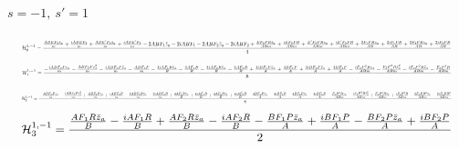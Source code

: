 \documentclass[10pt]{article}
\begin{document}
\paragraph{$s=-1,\ s'=1$}
\begin{equation*}
\resizebox{0.98\textwidth}{!}{${\displaystyle \mathcal H^{1,-1}_0=\frac{\frac{A B E F_2 \bar z_a}{m} + \frac{i A B E F_2}{m} + \frac{A B E' F_2 \bar z_a}{m} + \frac{i A B E' F_2}{m} - 2 A B F_1 \bar z_a - 2 i A B F_1 - 2 A B F_2 \bar z_a - 2 i A B F_2 + \frac{E F_2 P R \bar z_a}{A B m} + \frac{i E F_2 P R}{A B m} + \frac{E' F_2 P R \bar z_a}{A B m} + \frac{i E' F_2 P R}{A B m} + \frac{2 F_1 P R \bar z_a}{A B} + \frac{2 i F_1 P R}{A B} + \frac{2 F_2 P R \bar z_a}{A B} + \frac{2 i F_2 P R}{A B}}{4}}$}
\end{equation*}
\begin{equation*}
\resizebox{0.98\textwidth}{!}{${\displaystyle \mathcal H^{1,-1}_1=\frac{- \frac{i A B F_2 P z_a}{m} - \frac{A B F_2 P \bar z_a^{2}}{m} - \frac{i A B F_2 P \bar z_a}{m} - \frac{A B F_2 P}{m} - \frac{4 i A F_1 R \bar z_a}{B} - \frac{4 A F_1 R}{B} - \frac{4 i A F_2 R \bar z_a}{B} - \frac{4 A F_2 R}{B} + \frac{4 i B F_1 P \bar z_a}{A} + \frac{4 B F_1 P}{A} + \frac{4 i B F_2 P \bar z_a}{A} + \frac{4 B F_2 P}{A} - \frac{i F_2 P^{2} R z_a}{A B m} - \frac{F_2 P^{2} R \bar z_a^{2}}{A B m} - \frac{i F_2 P^{2} R \bar z_a}{A B m} - \frac{F_2 P^{2} R}{A B m}}{8}}$}
\end{equation*}
\begin{equation*}
\resizebox{0.98\textwidth}{!}{${\displaystyle \mathcal H^{1,-1}_2=\frac{- \frac{A B F_2 P z_a}{m} - \frac{i A B F_2 P \bar z_a^{2}}{m} + \frac{A B F_2 P \bar z_a}{m} + \frac{i A B F_2 P}{m} - \frac{2 A B F_2 R \bar z_a}{m} - \frac{2 i A B F_2 R}{m} + \frac{4 A F_1 R \bar z_a}{B} + \frac{4 i A F_1 R}{B} + \frac{4 A F_2 R \bar z_a}{B} + \frac{4 i A F_2 R}{B} - \frac{4 B F_1 P \bar z_a}{A} - \frac{4 i B F_1 P}{A} - \frac{4 B F_2 P \bar z_a}{A} - \frac{4 i B F_2 P}{A} - \frac{F_2 P^{2} R z_a}{A B m} - \frac{i F_2 P^{2} R \bar z_a^{2}}{A B m} + \frac{F_2 P^{2} R \bar z_a}{A B m} + \frac{i F_2 P^{2} R}{A B m} - \frac{2 F_2 P R^{2} \bar z_a}{A B m} - \frac{2 i F_2 P R^{2}}{A B m}}{8}}$}
\end{equation*}
\begin{equation*}
\resizebox{0.98\textwidth}{!}{${\displaystyle \mathcal H^{1,-1}_3=\frac{\frac{A F_1 R \bar z_a}{B} - \frac{i A F_1 R}{B} + \frac{A F_2 R \bar z_a}{B} - \frac{i A F_2 R}{B} - \frac{B F_1 P \bar z_a}{A} + \frac{i B F_1 P}{A} - \frac{B F_2 P \bar z_a}{A} + \frac{i B F_2 P}{A}}{2}}$}
\end{equation*}
\end{document}
